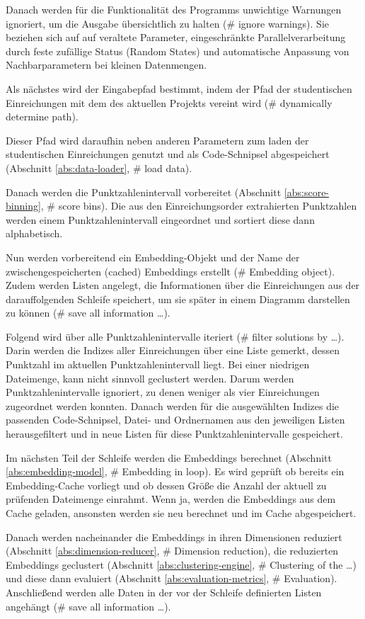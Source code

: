 Danach werden für die Funktionalität des Programms unwichtige Warnungen ignoriert, um die Ausgabe übersichtlich zu halten (\# ignore warnings). Sie beziehen sich auf auf veraltete Parameter, eingeschränkte Parallelverarbeitung durch feste zufällige Status (Random States) und automatische Anpassung von Nachbarparametern bei kleinen Datenmengen.

Als nächstes wird der Eingabepfad bestimmt, indem der Pfad der studentischen Einreichungen mit dem des aktuellen Projekts vereint wird (\# dynamically determine path).

Dieser Pfad wird daraufhin neben anderen Parametern zum laden der studentischen Einreichungen genutzt und als Code-Schnipsel abgespeichert (Abschnitt \ref{abs:data-loader}, \# load data).

Danach werden die Punktzahlenintervall vorbereitet (Abschnitt \ref{abs:score-binning}, \# score bins). Die aus den Einreichungsorder extrahierten Punktzahlen werden einem Punktzahlenintervall eingeordnet und sortiert diese dann alphabetisch.

Nun werden vorbereitend ein Embedding-Objekt und der Name der zwischengespeicherten (cached) Embeddings erstellt (\# Embedding object). Zudem werden Listen angelegt, die Informationen über die Einreichungen aus der darauffolgenden Schleife speichert, um sie später in einem Diagramm darstellen zu können (\# save all information \dots).

Folgend wird über alle Punktzahlenintervalle iteriert (\# filter solutions by \dots). Darin werden die Indizes aller Einreichungen über eine Liste gemerkt, dessen Punktzahl im aktuellen Punktzahlenintervall liegt. Bei einer niedrigen Dateimenge, kann nicht sinnvoll geclustert werden. Darum werden Punktzahlenintervalle ignoriert, zu denen weniger als vier Einreichungen zugeordnet werden konnten. Danach werden für die ausgewählten Indizes die passenden Code-Schnipsel, Datei- und Ordnernamen aus den jeweiligen Listen herausgefiltert und in neue Listen für diese Punktzahlenintervalle gespeichert.

Im nächsten Teil der Schleife werden die Embeddings berechnet (Abschnitt \ref{abs:embedding-model}, \# Embedding in loop). Es wird geprüft ob bereits ein Embedding-Cache vorliegt und ob dessen Größe die Anzahl der aktuell zu prüfenden Dateimenge einrahmt. Wenn ja, werden die Embeddings aus dem Cache geladen, ansonsten werden sie neu berechnet und im Cache abgespeichert.

Danach werden nacheinander die Embeddings in ihren Dimensionen reduziert (Abschnitt \ref{abs:dimension-reducer}, \# Dimension reduction), die reduzierten Embeddings geclustert (Abschnitt \ref{abs:clustering-engine}, \# Clustering of the \dots) und diese dann evaluiert (Abschnitt \ref{abs:evaluation-metrics}, \# Evaluation). Anschließend werden alle Daten in der vor der Schleife definierten Listen angehängt (\# save all information \dots).

